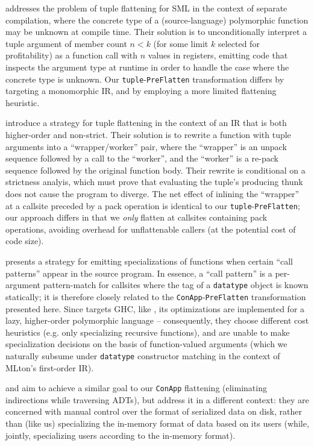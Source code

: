 \citet{compiling-with-types} addresses the problem of tuple flattening
for SML in the context of separate compilation, where the concrete type of a
(source-language) polymorphic function may be unknown at compile time. Their
solution is to unconditionally interpret a tuple argument of member count $n <
k$ (for some limit $k$ selected for profitability) as a function call with $n$
values in registers, emitting code that inspects the argument type at runtime in
order to handle the case where the concrete type is unknown.
Our \texttt{tuple}-\texttt{PreFlatten} transformation differs by targeting a
monomorphic IR, and by employing a more limited flattening heuristic.

\citet{haskell-fc-unbox} introduce a strategy for tuple flattening in the
context of an IR that is both higher-order and non-strict. Their solution is to
rewrite a function with tuple arguments into a ``wrapper/worker'' pair, where
the ``wrapper'' is an unpack sequence followed by a call to the ``worker'', and
the ``worker'' is a re-pack sequence followed by the original function body.
Their rewrite is conditional on a strictness analyis, which must prove that
evaluating the tuple's producing thunk does not cause the program to diverge.
The net effect of inlining the ``wrapper'' at a callsite preceded by a pack
operation is identical to our \texttt{tuple}-\texttt{PreFlatten}; our approach
differs in that we \textit{only} flatten at callsites containing pack
operations, avoiding overhead for unflattenable callers (at the potential cost
of code size).

\citet{haskell-callspec} presents a strategy for emitting specializations of
functions when certain ``call patterns'' appear in the source program. In
essence, a ``call pattern'' is a per-argument pattern-match for callsites where
the tag of a \texttt{datatype} object is known statically; it is therefore
closely related to the \texttt{ConApp}-\texttt{PreFlatten} transformation presented
here. Since \citet{haskell-callspec} targets GHC, like \citet{haskell-fc-unbox},
its optimizations are implemented for a lazy, higher-order polymorphic language
-- consequently, they choose different cost heuristics (e.g. only specializing
recursive functions), and are unable to make specialization decisions on the
basis of function-valued arguments (which we naturally subsume under
\texttt{datatype} constructor matching in the context of MLton's first-order
IR).

\citet{local-paper} and \citet{adt4hpc-paper} aim to achieve a similar goal to
our \texttt{ConApp} flattening (eliminating indirections while traversing ADTs),
but address it in a different context: they are concerned with manual control
over the format of serialized data on disk, rather than (like us) specializing
the in-memory format of data based on its users (while, jointly, specializing
users according to the in-memory format).

